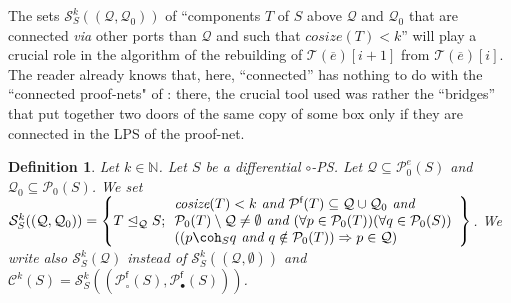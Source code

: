 \documentclass{article}
\theoremstyle{plain}
\newtheorem{definition}{Definition}
\newtheorem{rem}{Remark}
\newcommand{\Nat}{\ensuremath{\mathbb{N}}}
\newcommand{\nontrivialconnected}[3]{\mathcal{S}_{#1}^{#3}(#2)}
\newcommand{\connectedcomponents}[2]{\mathcal{C}^{#2}(#1)}
\newcommand{\taylor}[2]{\mathcal{T}(#1)[#2]}
\newcommand{\cosize}[1]{\textit{cosize}(#1)}
\newcommand{\portsatzero}[1]{\mathcal{P}_0(#1)}
\newcommand{\conclusions}[1]{\mathcal{P}^{\textsf{f}}(#1)}
\newcommand{\exponentialportsatzero}[1]{\mathcal{P}_0^\textit{e}(#1)}
\newcommand{\conclusionscirc}[1]{\mathcal{P}_\circ^{\textsf{f}}(#1)}
\newcommand{\conclusionsnotcirc}[1]{\mathcal{P}_\bullet^{\textsf{f}}(#1)}
\begin{document}
The sets $\nontrivialconnected{S}{(\mathcal{Q}, \mathcal{Q}_0)}{k}$ of ``components $T$ of $S$ above $\mathcal{Q}$ and $\mathcal{Q}_0$ that are connected \emph{via} other ports than $\mathcal{Q}$ and such that $\cosize{T} < k$'' will play a crucial role in the algorithm of the rebuilding of $\taylor{\overline{e}}{i+1}$ from $\taylor{\overline{e}}{i}$. The reader already knows that, here, ``connected'' has nothing to do with the ``connected proof-nets" of \cite{LPSinjectivity}: there, the crucial tool used was rather the ``bridges'' that put together two doors of the same copy of some box only if they are connected in the LPS of the proof-net.

\begin{definition}\label{defin: connected components}
Let $k \in \Nat$. 
Let $S$ be a differential $\circ$-PS. Let $\mathcal{Q} \subseteq \exponentialportsatzero{S}$ and $\mathcal{Q}_0 \subseteq \portsatzero{S}$. We set 
$\nontrivialconnected{S}{(\mathcal{Q}, \mathcal{Q}_0)}{k} = \left\lbrace T \trianglelefteq_\mathcal{Q} S ; \begin{array}{l} 
 \cosize{T} < k \textit{ and } \conclusions{T} \subseteq \mathcal{Q} \cup \mathcal{Q}_0 \textit{ and} \\ \portsatzero{T} \setminus \mathcal{Q} \not= \emptyset 
\textit{ and } (\forall p \in \portsatzero{T}) (\forall q \in \portsatzero{S}) \\
((p \coh_S q \textit{ and } q \notin \portsatzero{T}) \Rightarrow p \in \mathcal{Q})  \end{array} \right\rbrace$. 
We write also $\nontrivialconnected{S}{\mathcal{Q}}{k}$ instead of $\nontrivialconnected{S}{(\mathcal{Q}, \emptyset)}{k}$ and $\connectedcomponents{S}{k} = \nontrivialconnected{S}{(\conclusionscirc{S}, \conclusionsnotcirc{S})}{k}$.
\end{definition}

\begin{comment}
\begin{rem}
We have $\nontrivialconnected{S}{(\mathcal{Q}, \mathcal{Q}_0)}{k} = \nontrivialconnected{S}{(\mathcal{Q}, \mathcal{Q}_0 \setminus \mathcal{Q})}{k}$.
\end{rem}

\begin{rem}\label{remark: nonrivialconnected}
If $T \in \nontrivialconnected{S}{\mathcal{Q}}{k}$ and $\conclusions{T} \subseteq \mathcal{Q}_0 \subseteq \mathcal{Q}$, then $T \in \nontrivialconnected{S}{\mathcal{Q}_0}{k}$.
\end{rem}
\end{comment}
\end{document}
